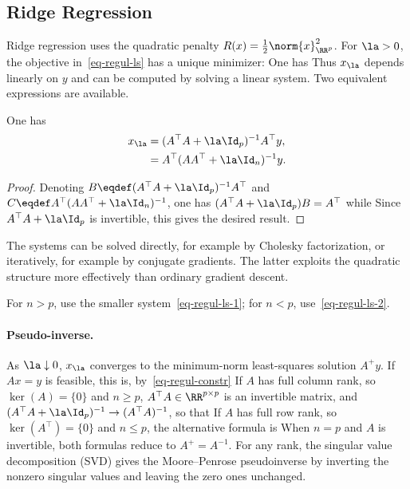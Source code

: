                                                                         
\subsection{Ridge Regression}

Ridge regression uses the quadratic penalty $R(x)=\frac12\norm{x}_{\RR^p}^2$. For $\la>0$, the objective in~\eqref{eq-regul-ls} has a unique minimizer:
One has 
Thus $x_\la$ depends linearly on $y$ and can be computed by solving a linear system. Two equivalent expressions are available.

\begin{prop}
	One has
	\begin{align}
		x_\la &= (A^\top A + \la \Id_p)^{-1} A^\top y,  \label{eq-regul-ls-1} \\
			 &= A^\top (A A^\top + \la \Id_n)^{-1} y. \label{eq-regul-ls-2} 
	\end{align}
\end{prop}

\begin{proof}
	Denoting $B \eqdef (A^\top A + \la \Id_p)^{-1} A^\top$ and $C \eqdef A^\top (A A^\top + \la \Id_n)^{-1}$, 
	one has $(A^\top A + \la \Id_p) B = A^\top$ while 
	Since $A^\top A + \la \Id_p$ is invertible, this gives the desired result.
\end{proof}

The systems can be solved directly, for example by Cholesky factorization, or iteratively, for example by conjugate gradients. The latter exploits the quadratic structure more effectively than ordinary gradient descent.

For $n>p$, use the smaller system~\eqref{eq-regul-ls-1}; for $n<p$, use~\eqref{eq-regul-ls-2}.

    
\paragraph{Pseudo-inverse.}

As $\la\downarrow0$, $x_\la$ converges to the minimum-norm least-squares solution $A^+y$. If $Ax=y$ is feasible, this is, by~\eqref{eq-regul-constr}
If $A$ has full column rank, so $\ker(A)=\{0\}$ and $n\geq p$, $A^\top A \in \RR^{p \times p}$ is an invertible matrix, and $(A^\top A + \la \Id_p)^{-1} \rightarrow (A^\top A)^{-1}$, so that
If $A$ has full row rank, so $\ker(A^\top)=\{0\}$ and $n\leq p$, the alternative formula is
When $n=p$ and $A$ is invertible, both formulas reduce to $A^+=A^{-1}$. For any rank, the singular value decomposition (SVD) gives the Moore--Penrose pseudoinverse by inverting the nonzero singular values and leaving the zero ones unchanged.

